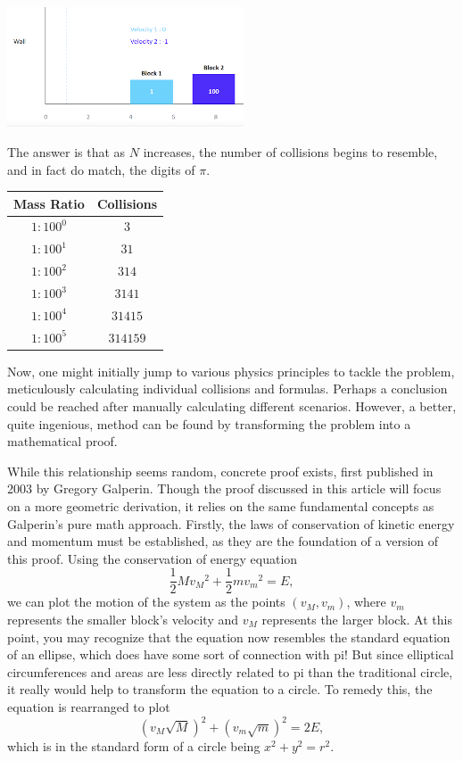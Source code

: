 \documentclass{article}
\begin{document}
\begin{multicols}{2}
\begin{center}
\includegraphics[width=7cm]{liang_1.png}
\end{center}

The answer is that as $N$ increases, the number of collisions begins to resemble, and in fact do match, the digits of $\pi$.

\begin{center}
\begin{tabular}{c|c}
    Mass Ratio & Collisions \\
    \hline
    $1:100^0$ & $3$ \\
    $1:100^1$ & $31$ \\
    $1:100^2$ & $314$ \\
    $1:100^3$ & $3141$ \\
    $1:100^4$ & $31415$ \\
    $1:100^5$ & $314159$ \\
\end{tabular}
\end{center}

Now, one might initially jump to various physics principles to tackle the problem, meticulously calculating individual collisions and formulas. Perhaps a conclusion could be reached after manually calculating different scenarios. However, a better, quite ingenious, method can be found by transforming the problem into a mathematical proof. 

While this relationship seems random, concrete proof exists, first published in 2003 by Gregory Galperin. Though the proof discussed in this article will focus on a more geometric derivation, it relies on the same fundamental concepts as Galperin’s pure math approach. Firstly, the laws of conservation of kinetic energy and momentum must be established, as they are the foundation of a version of this proof. Using the conservation of energy equation $$\frac{1}{2} M {v_M}^2 + \frac{1}{2} m {v_m}^2 = E,$$ we can plot the motion of the system as the points $(v_M, v_m)$, where $v_m$ represents the smaller block's velocity and $v_M$ represents the larger block. At this point, you may recognize that the equation now resembles the standard equation of an ellipse, which does have some sort of connection with pi! But since elliptical circumferences and areas are less directly related to pi than the traditional circle, it really would help to transform the equation to a circle. To remedy this, the equation is rearranged to plot $$(v_M \sqrt{M})^2 + (v_m \sqrt{m})^2 = 2E,$$ which is in the standard form of a circle being $x^2 + y^2 = r^2$.


\end{multicols}
\end{document}
